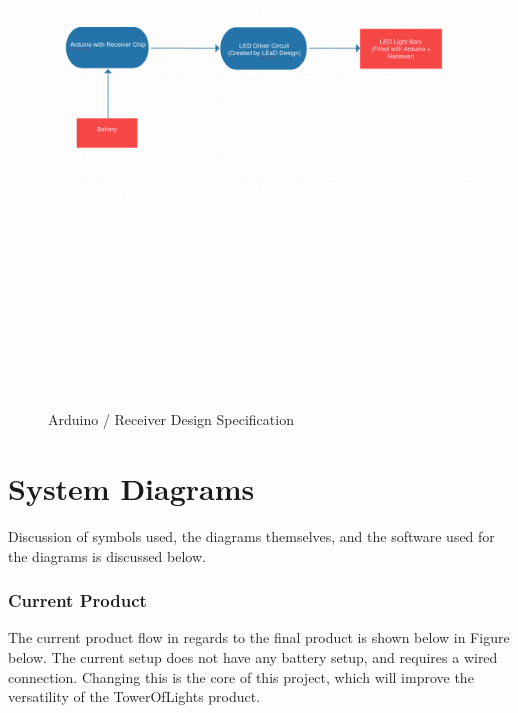 \documentclass[12pt]{article}
\begin{document}
	\begin{figure}[!htb]
		\centering
		\includegraphics[width = 160mm, height = 160mm]{assets/Arduino_Receiver_Diagram.png}
		\caption{Arduino / Receiver Design Specification \label{overflow}}
	\end{figure}

	\newpage

\section{System Diagrams}
	Discussion of symbols used, the diagrams themselves, and the software used for the diagrams is discussed below.
	
	\subsubsection{Current Product}
	The current product flow in regards to the final product is shown below in Figure below. The current setup does not have any battery setup, and requires a wired connection. Changing this is the core of this project, which will improve the versatility of the TowerOfLights product.
	
\end{document}
